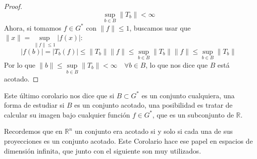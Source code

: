 \begin{coro}
\begin{proof}
        \begin{equation*}
            \sup\limits_{b\in B}\|T_b\| < \infty
        \end{equation*}
        Ahora, si tomamos $f\in G^\ast$ con $\|f\|\leq 1$, buscamos usar que $\|x\| = \sup\limits_{\|f\|\leq 1}|f(x)|$:
        \begin{equation*}
            |f(b)| = |T_b(f)| \leq \|T_b\|\|f\| \leq \sup_{b\in B}\|T_b\|\|f\| \leq \sup_{b\in B}\|T_b\|
        \end{equation*}
        Por lo que $\|b\| \leq \sup\limits_{b\in B}\|T_b\| < \infty \quad \forall b\in B$, lo que nos dice que $B$ está acotado.
    \end{proof}
\end{coro}

\noindent
Este último corolario nos dice que si $B\subset G^\ast$ es un conjunto cualquiera, una forma de estudiar si $B$ es un conjunto acotado, una posibilidad es tratar de calcular su imagen bajo cualquier función $f\in G^\ast$, que es un subconjunto de $\mathbb{R}$.

Recordemos que en $\mathbb{R}^n$ un conjunto era acotado si y solo si cada una de sus proyecciones es un conjunto acotado. Este Corolario hace ese papel en espacios de dimensión infinita, que junto con el siguiente son muy utilizados.

